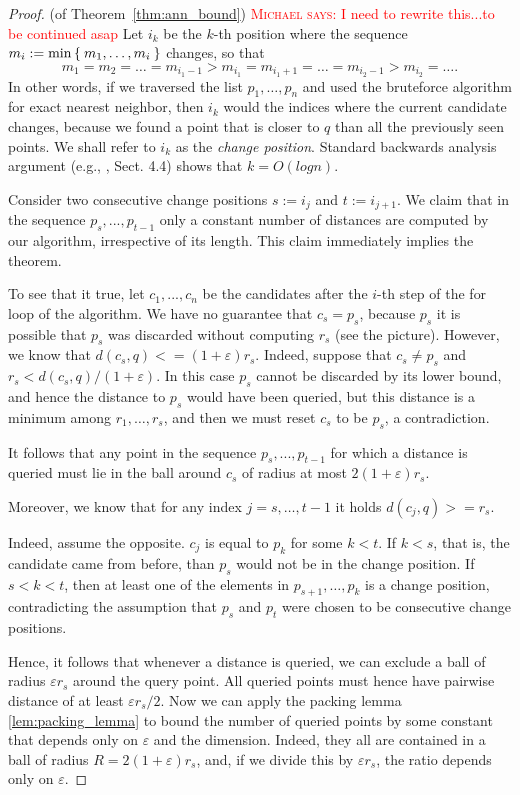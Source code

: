 \documentclass[a4paper,USenglish]{socg-lipics-v2018}
\newcommand{\eps}{\varepsilon}
\def\marrow{\marginpar[\hfill$\longrightarrow$]{$\longleftarrow$}}
\def\michael#1{\textcolor{red}{\textsc{Michael says: }{\marrow\sf #1}}}
\begin{document}
\begin{proof} (of Theorem~\ref{thm:ann_bound})
\michael{I need to rewrite this...to be continued asap}
Let $i_k$ be the {$k$-th} position where the sequence  $m_i := \min \Set{m_1, \dots, m_i}$
changes, so that
\[
m_1 = m_2 = \dots = m_{i_1 - 1} > m_{i_1} = m_{i_1 + 1} = \dots = m_{i_2 - 1} > m_{i_2} = \dots. 
\]
In other words, if we traversed the list $p_1, \dots, p_n$ and used the bruteforce algorithm
for exact nearest neighbor, then $i_k$ would the indices where the current candidate
changes, because we found a point that is closer to $q$ than all the previously seen points.
We shall refer to $i_k$ as the \textit{change position}.
Standard backwards analysis argument (e.g., \cite{dubch}, Sect. 4.4) shows that $k=O(log n)$.

    Consider two consecutive change positions $s:=i_j$ and $t:=i_{j+1}$. We claim that in the sequence
$p_s,...,p_{t-1}$
only a constant number of distances are computed by our algorithm, irrespective of its length. This claim immediately implies the theorem.

To see that it true, let $c_1,...,c_n$ be the candidates after the $i$-th step of
the for loop of the algorithm. We have no guarantee that $c_s=p_s$, because $p_s$ it is possible
    that $p_s$ was discarded without computing $r_s$ (see the picture). However, we know that
$d(c_s,q)<=(1+ \eps) r_s$.
Indeed, suppose that $c_s \neq p_s$ and $r_s < d(c_s,q)/(1+\eps)$. In this
    case $p_s$ cannot be discarded 
by its lower bound, and hence the distance to $p_s$ would
have been queried, but this distance is a minimum among $r_1, \dots, r_s$,
    and then we must reset $c_s$ to be $p_s$, a contradiction.

It follows that any point in the sequence $p_s,...,p_{t-1}$ for which a
distance is queried must lie in the ball around $c_s$ of radius at most $2(1+\eps)r_s$.

Moreover, we know that for any index $j=s,\dots, t-1$ it holds
$d(c_j,q)>=r_s$.

Indeed, assume the opposite. $c_j$ is equal to $p_k$ for some $k<t$. If $k<s$,
that is, the candidate came from before, than $p_s$ would not be in the
change position. If $s<k<t$, then at least one of the
elements in $p_{s+1},\dots,p_k$ is a change position, contradicting
the assumption that $p_s$ and $p_t$ were chosen to be consecutive change positions.

Hence, it follows that whenever a distance is queried, we can exclude a
ball of radius $\eps r_s$ around the query point. All queried points must
hence have pairwise distance of at least $ \eps r_s / 2$. 
Now we can apply the packing lemma \ref{lem:packing_lemma} to bound the number of
queried points by some constant that depends only on $\eps$ and the dimension. Indeed,
they all are contained in a ball of radius $R = 2(1+\eps)r_s$, and, if we divide this by $\eps r_s$, the ratio depends only on $\eps$.
\end{proof}
\end{document}
